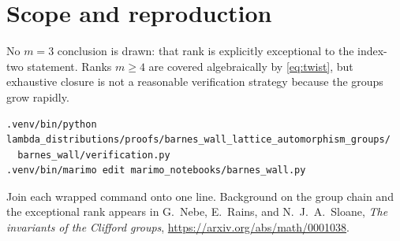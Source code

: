 \documentclass[11pt]{article}
\begin{document}
\section{Scope and reproduction}
No $m=3$ conclusion is drawn: that rank is explicitly exceptional to the
index-two statement.  Ranks $m\geq4$ are covered algebraically by
\eqref{eq:twist}, but exhaustive closure is not a reasonable verification
strategy because the groups grow rapidly.
\begin{verbatim}
.venv/bin/python lambda_distributions/proofs/barnes_wall_lattice_automorphism_groups/
  barnes_wall/verification.py
.venv/bin/marimo edit marimo_notebooks/barnes_wall.py
\end{verbatim}
Join each wrapped command onto one line.  Background on the group chain and
the exceptional rank appears in G.~Nebe, E.~Rains, and N.~J.~A.~Sloane,
\emph{The invariants of the Clifford groups},
\url{https://arxiv.org/abs/math/0001038}.
\end{document}
